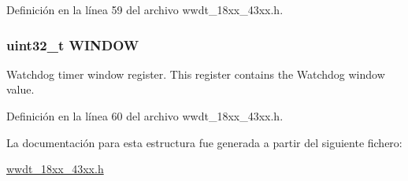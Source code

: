 Definición en la línea 59 del archivo wwdt\+\_\+18xx\+\_\+43xx.\+h.

\subsubsection[{\texorpdfstring{W\+I\+N\+D\+OW}{WINDOW}}]{ uint32\+\_\+t W\+I\+N\+D\+OW}\hypertarget{struct_l_p_c___w_w_d_t___t_a0ce43cecac8e564afd27fe0489eaff41}{}\label{struct_l_p_c___w_w_d_t___t_a0ce43cecac8e564afd27fe0489eaff41}
Watchdog timer window register. This register contains the Watchdog window value. 

Definición en la línea 60 del archivo wwdt\+\_\+18xx\+\_\+43xx.\+h.



La documentación para esta estructura fue generada a partir del siguiente fichero\+:\begin{DoxyCompactItemize}
\item 
\hyperlink{wwdt__18xx__43xx_8h}{wwdt\+\_\+18xx\+\_\+43xx.\+h}\end{DoxyCompactItemize}
